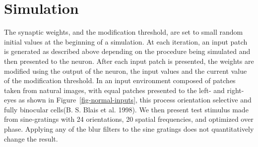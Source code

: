 \documentclass[
  letterpaper,
]{book}
\begin{document}
\hypertarget{simulation}{%
\section{Simulation}\label{simulation}}

The synaptic weights, and the modification threshold, are set to small
random initial values at the beginning of a simulation. At each
iteration, an input patch is generated as described above depending on
the procedure being simulated and then presented to the neuron. After
each input patch is presented, the weights are modified using the output
of the neuron, the input values and the current value of the
modification threshold. In an input environment composed of patches
taken from natural images, with equal patches presented to the left- and
right-eyes as shown in Figure~\ref{fig-normal-inputs}, this process
orientation selective and fully binocular cells(B. S. Blais et al.
1998). We then present test stimulus made from sine-gratings with 24
orientations, 20 spatial frequencies, and optimized over phase. Applying
any of the blur filters to the sine gratings does not quantitatively
change the result.
\end{document}
